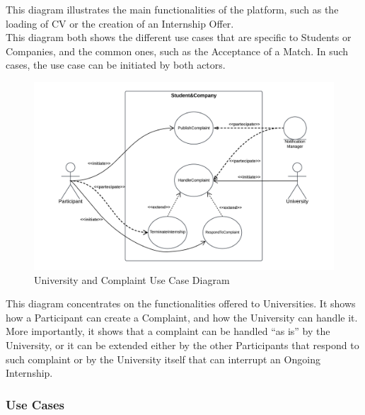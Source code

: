 This diagram illustrates the main functionalities of the platform, such as the loading of CV or the creation of an Internship Offer. \\
This diagram both shows the different use cases that are specific to Students or Companies, and the common ones, such as the Acceptance of a Match. In such cases, the use case can be initiated by both actors.
\clearpage
\begin{figure}[H]
    \centering
    \includegraphics[width=1 \textwidth]{Latex/Images/RASD/UseCases/UniversityUseCaseDiagram.png}
    \caption{University and Complaint Use Case Diagram}
    \label{fig:UniveristyUseCaseDiagram}
\end{figure}
This diagram concentrates on the functionalities offered to Universities. It shows how a Participant can create a Complaint, and how the University can handle it. \\
More importantly, it shows that a complaint can be handled “as is” by the University, or it can be extended either by the other Participants that respond to such complaint or by the University itself that can interrupt an Ongoing Internship.
\clearpage

\subsubsection{Use Cases}

